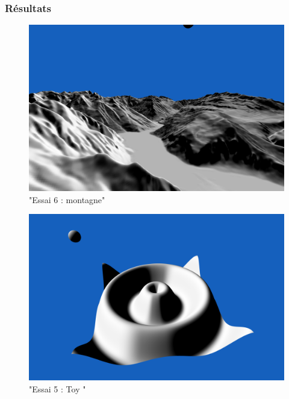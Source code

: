 \documentclass[a4paper]{article}
\begin{document}
\subsubsection{Résultats}
\begin{figure}[thb]
	\centering
    \includegraphics[scale=0.3]{Images/Essais/Essai_6_mount.png}
    \caption{"Essai 6 : montagne"}
 \end{figure}



\begin{figure}[thb]
	\centering
    \includegraphics[scale=0.3]{Images/Essais/Essai_6_toy.png}
    \caption{"Essai 5 : Toy "}
 \end{figure}
\end{document}

